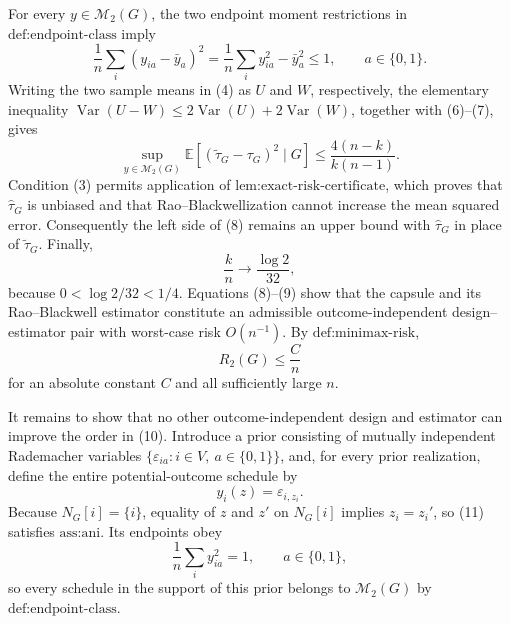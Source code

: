 For every \(y\in\mathcal M_2(G)\), the two endpoint moment restrictions in \(\text{def:endpoint-class}\) imply
\[
\frac1n\sum_i(y_{ia}-\bar y_a)^2
=\frac1n\sum_i y_{ia}^2-\bar y_a^2\le 1,
\qquad a\in\{0,1\}. \tag{7}
\]
Writing the two sample means in (4) as \(U\) and \(W\), respectively, the elementary inequality
\(\operatorname{Var}(U-W)\le 2\operatorname{Var}(U)+2\operatorname{Var}(W)\), together with (6)--(7), gives
\[
\sup_{y\in\mathcal M_2(G)}
\mathbb E[(\widetilde\tau_G-\tau_G)^2\mid G]
\le \frac{4(n-k)}{k(n-1)}. \tag{8}
\]
Condition (3) permits application of \(\text{lem:exact-risk-certificate}\), which proves that \(\widehat\tau_G\) is unbiased and that Rao--Blackwellization cannot increase the mean squared error.  Consequently the left side of (8) remains an upper bound with \(\widehat\tau_G\) in place of \(\widetilde\tau_G\).  Finally,
\[
\frac{k}{n}\longrightarrow \frac{\log 2}{32}, \tag{9}
\]
because \(0<\log 2/32<1/4\).  Equations (8)--(9) show that the capsule and its Rao--Blackwell estimator constitute an admissible outcome-independent design--estimator pair with worst-case risk \(O(n^{-1})\).  By \(\text{def:minimax-risk}\),
\[
R_2(G)\le \frac{C}{n} \tag{10}
\]
for an absolute constant \(C\) and all sufficiently large \(n\).

It remains to show that no other outcome-independent design and estimator can improve the order in (10).  Introduce a prior consisting of mutually independent Rademacher variables \(\{\varepsilon_{ia}:i\in V,\ a\in\{0,1\}\}\), and, for every prior realization, define the entire potential-outcome schedule by
\[
y_i(z)=\varepsilon_{i,z_i}. \tag{11}
\]
Because \(N_G[i]=\{i\}\), equality of \(z\) and \(z'\) on \(N_G[i]\) implies \(z_i=z_i'\), so (11) satisfies \(\text{ass:ani}\).  Its endpoints obey
\[
\frac1n\sum_i y_{ia}^2=1,
\qquad a\in\{0,1\}, \tag{12}
\]
so every schedule in the support of this prior belongs to \(\mathcal M_2(G)\) by \(\text{def:endpoint-class}\).

